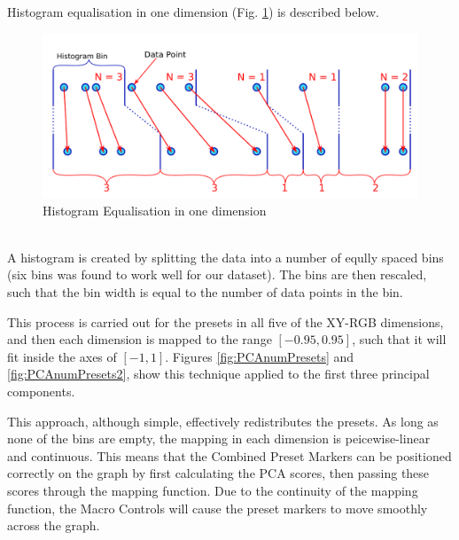 \documentclass[11pt, oneside]{report}   	%
\begin{document}
Histogram equalisation in one dimension (Fig. \ref{fig:HistEq}) is described below.
\begin{figure}[h] 
	\vspace{-20pt}
	\centering
	\includegraphics[trim={0, 5pt, 0, 5pt}, clip, width = 6in]{HistogramEquilisation.png}
	\caption{Histogram Equalisation in one dimension}
	\label{fig:HistEq}
\end{figure}\\
A histogram is created by splitting the data into a number of eqully spaced bins (six bins was found to work well for our dataset). The bins are then rescaled, such that the bin width is equal to the number of data points in the bin.

This process is carried out for the presets in all five of the XY-RGB dimensions, and then each dimension is mapped to the range $[-0.95, 0.95]$, such that it will fit inside the axes of $[-1, 1]$. Figures \ref{fig:PCAnumPresets} and \ref{fig:PCAnumPresets2}, show this technique applied to the first three principal components.

This approach, although simple, effectively redistributes the presets. As long as none of the bins are empty, the mapping in each dimension is peicewise-linear and continuous. This means that the Combined Preset Markers can be positioned correctly on the graph by first calculating the PCA scores, then passing these scores through the mapping function. Due to the continuity of the mapping function, the Macro Controls will cause the preset markers to move smoothly across the graph.
\end{document}
